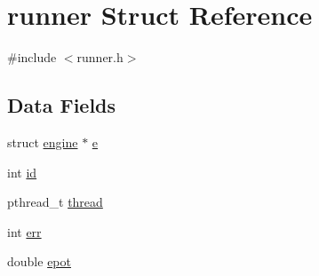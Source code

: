 \hypertarget{structrunner}{\section{runner Struct Reference}
\label{structrunner}
}


{\ttfamily \#include $<$runner.\-h$>$}

\subsection*{Data Fields}
\begin{DoxyCompactItemize}
\item 
struct \hyperlink{structengine}{engine} $\ast$ \hyperlink{structrunner_a9bbd1f231e51d1c76b353c3eec2169e1}{e}
\item 
int \hyperlink{structrunner_a7441ef0865bcb3db9b8064dd7375c1ea}{id}
\item 
pthread\-\_\-t \hyperlink{structrunner_a01f75a9ad916f63a94e06a27635ba278}{thread}
\item 
int \hyperlink{structrunner_a6ce68847c12434f60d1b2654a3dc3409}{err}
\item 
double \hyperlink{structrunner_a3e050eccabbd5322482d7f63e45f038d}{epot}
\end{DoxyCompactItemize}


